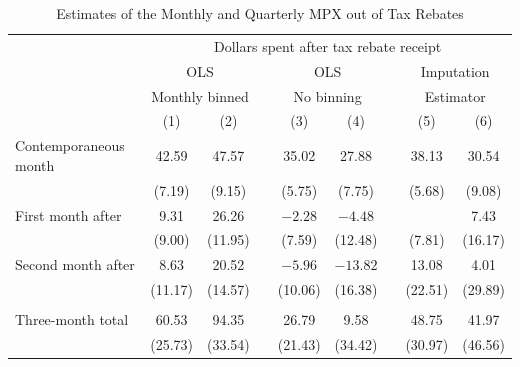 \documentclass[english,11pt]{article}
\providecommand{\tabularnewline}{\\}
\theoremstyle{plain}
\theoremstyle{plain}
\theoremstyle{plain}
\theoremstyle{plain}
\begin{document}
\begin{table}
\caption{Estimates of the Monthly and Quarterly MPX out of Tax Rebates{\small{}\label{tab:replication_BP}}}

\medskip{}

\begin{centering}
{\small{}}%
\begin{tabular}{lcccccccc}
\toprule 
 & \multicolumn{8}{c}{{\small{}Dollars spent after tax rebate receipt}}\tabularnewline
\cmidrule{2-9} \cmidrule{3-9} \cmidrule{4-9} \cmidrule{5-9} \cmidrule{6-9} \cmidrule{7-9} \cmidrule{8-9} \cmidrule{9-9} 
 & \multicolumn{2}{c}{{\small{}OLS}} &  & \multicolumn{2}{c}{{\small{}OLS}} &  & \multicolumn{2}{c}{{\small{}Imputation}}\tabularnewline
 & \multicolumn{2}{c}{{\small{}Monthly binned}} &  & \multicolumn{2}{c}{{\small{}No binning}} &  & \multicolumn{2}{c}{{\small{}Estimator}}\tabularnewline
 & {\small{}(1)} & {\small{}(2)} &  & {\small{}(3)} & {\small{}(4)} &  & {\small{}(5)} & {\small{}(6)}\tabularnewline
\midrule
{\footnotesize{}Contemporaneous month} & {\footnotesize{}42.59} & {\footnotesize{}47.57} &  & {\footnotesize{}35.02} & {\footnotesize{}27.88} &  & {\footnotesize{}38.13} & {\footnotesize{}30.54}\tabularnewline
 & {\footnotesize{}(7.19)} & {\footnotesize{}(9.15)} &  & {\footnotesize{}(5.75)} & {\footnotesize{}(7.75)} &  & {\footnotesize{}(5.68)} & {\footnotesize{}(9.08)}\tabularnewline
{\footnotesize{}First month after} & {\footnotesize{}9.31} & {\footnotesize{}26.26} &  & {\footnotesize{}$-2.28$} & {\footnotesize{}$-4.48$} &  & {\footnotesize{}\textendash 2.47} & {\footnotesize{}7.43}\tabularnewline
 & {\footnotesize{}(9.00)} & {\footnotesize{}(11.95)} &  & {\footnotesize{}(7.59)} & {\footnotesize{}(12.48)} &  & {\footnotesize{}(7.81)} & {\footnotesize{}(16.17)}\tabularnewline
{\footnotesize{}Second month after} & {\footnotesize{}8.63} & {\footnotesize{}20.52} &  & {\footnotesize{}$-5.96$} & {\footnotesize{}$-13.82$} &  & {\footnotesize{}13.08} & {\footnotesize{}4.01}\tabularnewline
 & {\footnotesize{}(11.17)} & {\footnotesize{}(14.57)} &  & {\footnotesize{}(10.06)} & {\footnotesize{}(16.38)} &  & {\footnotesize{}(22.51)} & {\footnotesize{}(29.89)}\tabularnewline
 &  &  &  &  &  &  &  & \tabularnewline
{\footnotesize{}Three-month total} & {\footnotesize{}60.53} & {\footnotesize{}94.35} &  & {\footnotesize{}26.79} & {\footnotesize{}9.58} &  & {\footnotesize{}48.75} & {\footnotesize{}41.97}\tabularnewline
 & {\footnotesize{}(25.73)} & {\footnotesize{}(33.54)} &  & {\footnotesize{}(21.43)} & {\footnotesize{}(34.42)} &  & {\footnotesize{}(30.97)} & {\footnotesize{}(46.56)}\tabularnewline

\end{tabular}
\end{centering}
\end{table}
\end{document}
